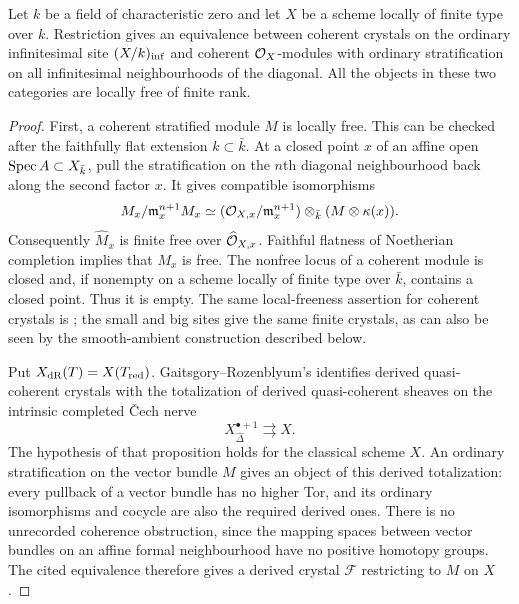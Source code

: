 \begin{proposition}\label{prop:DE-E2-coherent}
Let $k$ be a field of characteristic zero and let $X$ be a scheme locally of finite type over $k$.  Restriction gives an equivalence between coherent crystals on the ordinary infinitesimal site $(X/k)_{\rm inf}$ and coherent $\mathcal O_X$-modules with ordinary stratification on all infinitesimal neighbourhoods of the diagonal.  All the objects in these two categories are locally free of finite rank.
\end{proposition}
\begin{proof}
First, a coherent stratified module $M$ is locally free.  This can be checked after the faithfully flat extension $k\subset\bar k$.  At a closed point $x$ of an affine open $\operatorname{Spec} A\subset X_{\bar k}$, pull the stratification on the $n$th diagonal neighbourhood back along the second factor $x$.  It gives compatible isomorphisms
\[
 M_x/\mathfrak m_x^{n+1}M_x
  \simeq (\mathcal O_{X,x}/\mathfrak m_x^{n+1})
                  \otimes_{\bar k}(M\otimes\kappa(x)).
\]
Consequently $\widehat M_x$ is finite free over $\widehat{\mathcal O}_{X,x}$.  Faithful flatness of Noetherian completion implies that $M_x$ is free.  The nonfree locus of a coherent module is closed and, if nonempty on a scheme locally of finite type over $\bar k$, contains a closed point.  Thus it is empty.  The same local-freeness assertion for coherent crystals is \cite[Theorem~6.8(4), with Axiom~A of~5.2]{ToniniZhang2019}; the small and big sites give the same finite crystals, as can also be seen by the smooth-ambient construction described below.

Put $X_{\mathrm{dR}}(T)=X(T_{\rm red})$.  Gaitsgory--Rozenblyum's \cite[Proposition~3.4.3]{GaitsgoryRozenblyum2014} identifies derived quasi-coherent crystals with the totalization of derived quasi-coherent sheaves on the intrinsic completed \v Cech nerve
\[
             X^{\bullet+1}_{\widehat\Delta}
                      \rightrightarrows X .
\]
The hypothesis of that proposition holds for the classical scheme $X$.  An ordinary stratification on the vector bundle $M$ gives an object of this derived totalization: every pullback of a vector bundle has no higher Tor, and its ordinary isomorphisms and cocycle are also the required derived ones.  There is no unrecorded coherence obstruction, since the mapping spaces between vector bundles on an affine formal neighbourhood have no positive homotopy groups.  The cited equivalence therefore gives a derived crystal $\mathcal F$ restricting to $M$ on $X$.


\end{proof}
